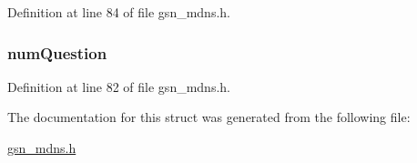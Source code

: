Definition at line 84 of file gsn\_\-mdns.h.

\hypertarget{a00013_ace2f6735b9b6967e5f120d3e00514d26}{
\subsubsection[{numQuestion}]{ {\bf numQuestion}}}
\label{a00013_ace2f6735b9b6967e5f120d3e00514d26}


Definition at line 82 of file gsn\_\-mdns.h.



The documentation for this struct was generated from the following file:\begin{DoxyCompactItemize}
\item 
\hyperlink{a00526}{gsn\_\-mdns.h}\end{DoxyCompactItemize}
